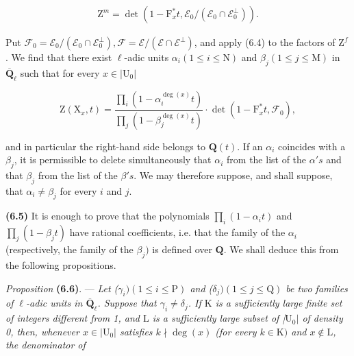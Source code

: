 \documentclass[10pt,leqno]{article}
\begin{document}
\begin{equation*}\begin{gathered}\mathrm{Z}^{m}=\operatorname{det}(1- \mathrm{F}_{x}^{*}t,\mathcal{E} _{0}/(\mathcal{E} _{0}\cap \mathcal{E} _{0}^{\perp })).\end{gathered}\end{equation*}

\noindent Put \(\mathcal{F} _{0}=\mathcal{E} _{0}/(\mathcal{E} _{0}\cap \mathcal{E} _{0}^{\perp }), \mathcal{F} =\mathcal{E} /(\mathcal{E} \cap \mathcal{E} ^{\perp })\), and apply (6.4) to the factors of \(\mathrm{Z}^{f}\). We find that there exist \(\ell \)-adic units \(\alpha _{i} (1\leq i\leq \mathrm{N})\) and \(\beta _{j} (1\leq j\leq \mathrm{M})\) in \(\overline{\mathbf{Q}}_{\ell }\) such that for every \(x\in |\mathrm{U}_{0}|\)\par

\[\mathrm{Z}(\mathrm{X}_{x},t)=\frac{\prod\limits _{i}(1- \alpha _{i}^{\operatorname{deg}(x)}t)}{\prod\limits _{j}(1- \beta _{j}^{\operatorname{deg}(x)}t)}\cdot \operatorname{det}(1- \mathrm{F}_{x}^{*}t,\mathcal{F} _{0}),\]

\noindent and in particular the right-hand side belongs to \(\mathbf{Q}(t)\). If an \(\alpha _{i}\) coincides with a \(\beta _{j}\), it is permissible to delete simultaneously that \(\alpha _{i}\) from the list of the \(\alpha 's\) and that \(\beta _{j}\) from the list of the \(\beta 's\). We may therefore suppose, and shall suppose, that \(\alpha _{i}\ne \beta _{j}\) for every \(i\) and \(j\).\par

\noindent \textbf{(6.5)} It is enough to prove that the polynomials \(\prod _{i}(1- \alpha _{i} t)\) and \(\prod _{j}(1- \beta _{j} t)\) have rational coefficients, i.e. that the family of the \(\alpha _{i}\) (respectively, the family of the \(\beta _{j})\) is defined over \(\mathbf{Q}\). We shall deduce this from the following propositions.\par

\noindent \emph{Proposition} \textbf{(6.6)}. — {\itshape Let (\(\gamma _{i}) (1\leq i\leq \mathrm{P})\) and (\(\delta _{j}) (1\leq j\leq \mathrm{Q})\) be two families of \(\ell \)-adic units in \(\overline{\mathbf{Q}}_{\ell }\). Suppose that \(\gamma _{i}\ne \delta _{j}\). If \(\mathrm{K}\) is a sufficiently large finite set of integers different from 1, and \(\mathrm{L}\) is a sufficiently large subset of |\(\mathrm{U}_{0}|\) of density 0, then, whenever \(x\in |\mathrm{U}_{0}|\) satisfies \(k\nmid \operatorname{deg}(x)\) (for every \(k\in \mathrm{K})\) and \(x\notin \mathrm{L}\), the denominator of}\par
\end{document}
